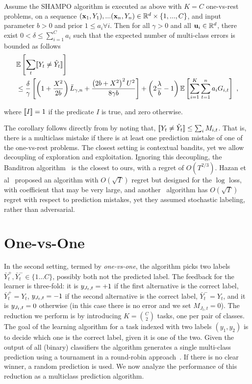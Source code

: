 \begin{corollary}
Assume the SHAMPO algorithm is executed as above with $K=C$ one-vs-rest problems, on a sequence 
$(\mathbf{x}_1,Y_1),...(\mathbf{x}_n,Y_n)\in\mathbb{R}^d\times\{1,...,C\}$, and input parameter $b>0$  and prior 
$1\le a_i\forall i$. Then for all $\gamma>0$ and all $\mathbf{u}_{i}\in\mathbb{R}^d$, there exist 
$0<\delta\le \sum_{i=1}^Ca_{i}$ such that the expected number of multi-class errors is bounded as follows
 \[
 \begin{split}
 &\mathbb{E}\left[{\sum_t [\![{Y_t \neq \hat{Y}_t}]\!]}\right]\\
 &\le \frac{\delta}{\gamma}\left[{\left(1+\frac{X^2}{2b} \right){\bar L}_{\gamma,n}+
 \frac{\left({2b+X^2}\right)^2U^2}{8{\gamma}b}}\right]
 +\left({2\frac{\lambda}{b}-1}\right)\mathbb{E}\left[{\sum_{i=1}^{K}\sum_{t=1}^{n}{a_{i}G_{i,t}}}\right]~,
 \end{split}
 \]


where $[\![{I}]\!]=1$ if the predicate $I$ is true, and zero otherwise.
\end{corollary}
The corollary follows directly from  by noting that, 
$[\![{Y_t \neq \hat{Y}_t}]\!] \leq \sum_i M_{i,t}$. That is, there is a multiclass mistake if there is at least one 
prediction mistake of one of the one-vs-rest problems. The closest setting is contextual bandits, yet we 
allow decoupling of exploration and exploitation. Ignoring this decoupling, the 
Banditron algorithm~\cite{kakade2008efficient} is the closest to ours, 
with a regret of $O(T^{2/3})$. Hazan et al~\cite{hazan2011newtron} proposed an algorithm 
with $O(\sqrt{T})$ regret but designed for the $\log$ loss, with coefficient that may be very large, and 
another~\cite{DBLP:journals/ml/CrammerG13} algorithm has $O(\sqrt{T})$ regret with respect to prediction 
mistakes, yet they assumed stochastic labeling, rather than adversarial.


\section{One-vs-One}
In the second setting, termed by {\em one-vs-one}, the algorithm picks two labels 
$\bar{Y}^+_t,\bar{Y}^-_t \in\{1\dots C\}$, possibly both not the predicted label. 
The feedback for the learner is three-fold: it is $y_{J_t,t}=+1$ if the first alternative is the correct label, 
$\bar{Y}^+_t=Y_t$, $y_{J_t,t}=-1$ if the second alternative is the correct label, $\bar{Y}^-_t=Y_t$, 
and it is $y_{J_t,t}=0$ otherwise (in this case there is no error and we set $M_{J_t,t}=0$). 
The reduction we perform is by introducing $K= {C \choose 2}$ tasks, one per pair of classes.  
The goal of the learning algorithm for a task indexed with two labels $(y_1,y_2)$ is to decide 
which one is the correct label, given it is one of the two. Given the output of all (binary) classifiers the 
algorithm generates a single multi-class prediction using a tournament in a round-robin 
approach~\cite{DBLP:journals/jmlr/Furnkranz02}. If there is no clear winner, a random prediction is used. 
We now analyze the performance of this reduction as a multiclass prediction algorithm.

